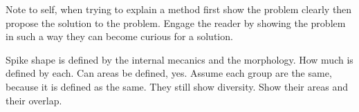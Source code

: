 Note to self, when trying to explain a method first show the problem clearly
then propose the solution to the problem. Engage the reader by showing the 
problem in such a way they can become curious for a solution. 

Spike shape is defined by the internal mecanics and the morphology.
How much is defined by each.
Can areas be defined, yes.
Assume each group are the same, because it is defined as the same.
They still show diversity.
Show their areas and their overlap.


